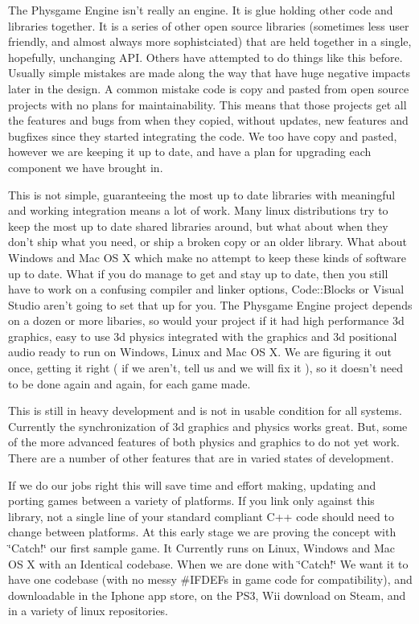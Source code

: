 The Physgame Engine isn't really an engine. It is glue holding other code and libraries together. It is a series of other open source libraries (sometimes less user friendly, and almost always more sophistciated) that are held together in a single, hopefully, unchanging API. Others have attempted to do things like this before. Usually simple mistakes are made along the way that have huge negative impacts later in the design. A common mistake code is copy and pasted from open source projects with no plans for maintainability. This means that those projects get all the features and bugs from when they copied, without updates, new features and bugfixes since they started integrating the code. We too have copy and pasted, however we are keeping it up to date, and have a plan for upgrading each component we have brought in.

This is not simple, guaranteeing the most up to date libraries with meaningful and working integration means a lot of work. Many linux distributions try to keep the most up to date shared libraries around, but what about when they don't ship what you need, or ship a broken copy or an older library. What about Windows and Mac OS X which make no attempt to keep these kinds of software up to date. What if you do manage to get and stay up to date, then you still have to work on a confusing compiler and linker options, Code::Blocks or Visual Studio aren't going to set that up for you. The Physgame Engine project depends on a dozen or more libaries, so would your project if it had high performance 3d graphics, easy to use 3d physics integrated with the graphics and 3d positional audio ready to run on Windows, Linux and Mac OS X. We are figuring it out once, getting it right ( if we aren't, tell us and we will fix it ), so it doesn't need to be done again and again, for each game made.

This is still in heavy development and is not in usable condition for all systems. Currently the synchronization of 3d graphics and physics works great. But, some of the more advanced features of both physics and graphics to do not yet work. There are a number of other features that are in varied states of development.

If we do our jobs right this will save time and effort making, updating and porting games between a variety of platforms. If you link only against this library, not a single line of your standard compliant C++ code should need to change between platforms. At this early stage we are proving the concept with \char`\"{}Catch!\char`\"{} our first sample game. It Currently runs on Linux, Windows and Mac OS X with an Identical codebase. When we are done with \char`\"{}Catch!\char`\"{} We want it to have one codebase (with no messy \#IFDEFs in game code for compatibility), and downloadable in the Iphone app store, on the PS3, Wii download on Steam, and in a variety of linux repositories.

